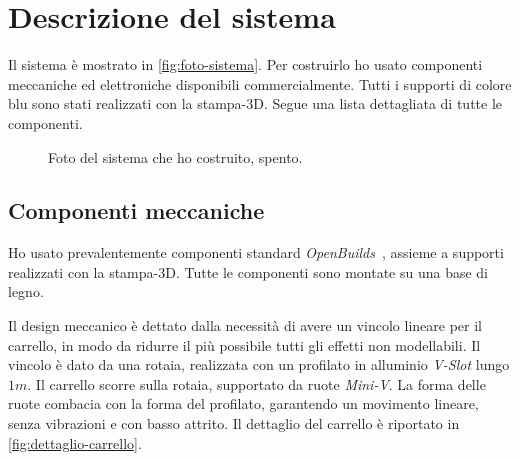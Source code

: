 \section{Descrizione del sistema}
\label{sec:sistema-reale}
Il sistema è mostrato in \autoref{fig:foto-sistema}.
Per costruirlo ho usato componenti meccaniche ed elettroniche
disponibili commercialmente.
Tutti i supporti di colore blu sono stati
realizzati con la stampa-3D. Segue una lista dettagliata di tutte le componenti.

\begin{figure}[H]
    \centering
    \caption[Foto del sistema]{Foto del sistema che ho costruito, spento.}
    \label{fig:foto-sistema}
\end{figure}

\subsection{Componenti meccaniche}
\label{subsec:componenti-meccaniche}
Ho usato prevalentemente componenti standard \emph{OpenBuilds}~\cite{openbuilds},
assieme a supporti realizzati con la stampa-3D.
Tutte le componenti sono montate su una base di legno.

Il design meccanico è dettato dalla necessità di avere un vincolo
lineare per il carrello,
in modo da ridurre il più possibile tutti gli effetti non modellabili.
Il vincolo è dato da una rotaia, realizzata con un profilato in alluminio
\emph{V-Slot} lungo $1m$.
Il carrello scorre sulla rotaia, supportato da
ruote \emph{Mini-V}.
La forma delle ruote combacia con la forma del profilato,
garantendo un movimento lineare, senza vibrazioni e con basso attrito.
Il dettaglio del carrello è riportato in \autoref{fig:dettaglio-carrello}.

